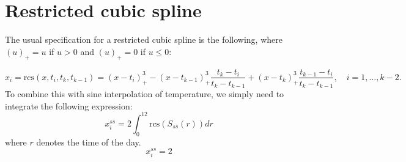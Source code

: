 \documentclass[12pt]{article}
\title{}
\author{}
\begin{document}
\maketitle

\begin{abstract}

\end{abstract}

\section{Restricted cubic spline}
The usual specification for a restricted cubic spline is the following, where $(u)_{+} = u$ if $u > 0$  and $(u)_{+} = 0$ if $u \leq 0$:

\begin{equation}\label{eq:cubic_spline_standard}
x_{i} = \mbox{rcs}(x, t_{i}, t_{k}, t_{k - 1}) = (x - t_{i})^3_{+} - (x - t_{k-1})^3_{+}\dfrac{t_{k} - t_{i}}{t_{k} - t_{k-1}} + (x - t_{k})^3_{+}\dfrac{t_{k - 1} - t_{i}}{t_{k} - t_{k - 1}}, \quad i = 1, \dots, k - 2.
\end{equation}
To combine this with sine interpolation of temperature, we simply need to integrate the following expression:
\begin{equation}\label{eq:cubic_spline_sine_interpolation}
x_{i}^{ss} = 2\int_{0}^{12}\mbox{rcs}(S_{ss}(r))dr
\end{equation}
where $r$ denotes the time of the day.
\begin{equation}\label{eq:cubic_spline_sine_interpolation2}
x_{i}^{ss} = 2
\end{equation}
\end{document}
